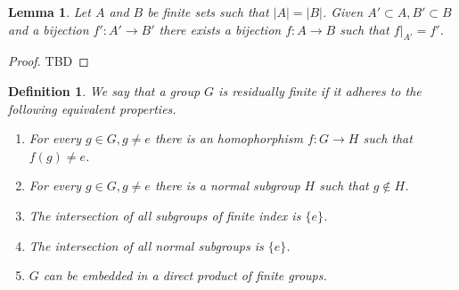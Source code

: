 \documentclass[a4paper]{memoir}
\newtheorem{definition}{Definition}
\newtheorem{lemma}{Lemma}
\begin{document}
    \begin{lemma}\label{lem:finite_bijections} 
        Let $A$ and $B$ be finite sets such that $|A| = |B|$. Given $A' \subset A, B' \subset B$ and a bijection $f': A' \to B'$ there exists a bijection $f:A \to B$ such that $f|_{A'} = f'$. 
    \end{lemma}
    \begin{proof}
        TBD
    \end{proof}

    \begin{definition}\cite{noauthor_residually_2018}
        We say that a group $G$ is residually finite if it adheres to the following equivalent properties.
        \begin{enumerate}
            \item For every $g \in G, g\ne e$ there is an homophorphism $f:G \to H$ such that $f(g) \ne e$.
            \item For every $g \in G, g \ne e$ there is a normal subgroup $H$ such that $g \notin H$.
            \item The intersection of all subgroups of finite index is $\{e\}$.
            \item The intersection of all normal subgroups is $\{e\}$.
            \item $G$ can be embedded in a direct product of finite groups.
        \end{enumerate}
    \end{definition}
    \printbibliography
\end{document}
